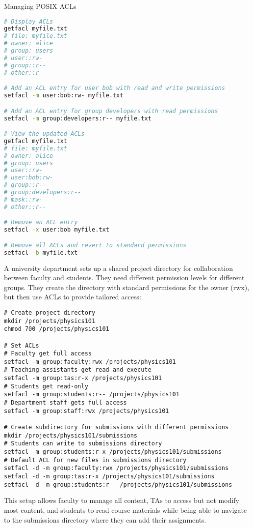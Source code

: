 \begin{code}{Managing POSIX ACLs}\\
\begin{lstlisting}[language=bash, style=basesmol]
# Display ACLs
getfacl myfile.txt
# file: myfile.txt
# owner: alice
# group: users
# user::rw-
# group::r--
# other::r--

# Add an ACL entry for user bob with read and write permissions
setfacl -m user:bob:rw- myfile.txt

# Add an ACL entry for group developers with read permissions
setfacl -m group:developers:r-- myfile.txt

# View the updated ACLs
getfacl myfile.txt
# file: myfile.txt
# owner: alice
# group: users
# user::rw-
# user:bob:rw-
# group::r--
# group:developers:r--
# mask::rw-
# other::r--

# Remove an ACL entry
setfacl -x user:bob myfile.txt

# Remove all ACLs and revert to standard permissions
setfacl -b myfile.txt
\end{lstlisting}
\end{code}

\begin{example}
A university department sets up a shared project directory for collaboration between faculty and students. They need different permission levels for different groups. They create the directory with standard permissions for the owner (rwx), but then use ACLs to provide tailored access:

\begin{lstlisting}[style=basesmol]
# Create project directory
mkdir /projects/physics101
chmod 700 /projects/physics101

# Set ACLs
# Faculty get full access
setfacl -m group:faculty:rwx /projects/physics101
# Teaching assistants get read and execute
setfacl -m group:tas:r-x /projects/physics101
# Students get read-only
setfacl -m group:students:r-- /projects/physics101
# Department staff gets full access
setfacl -m group:staff:rwx /projects/physics101

# Create subdirectory for submissions with different permissions
mkdir /projects/physics101/submissions
# Students can write to submissions directory
setfacl -m group:students:r-x /projects/physics101/submissions
# Default ACL for new files in submissions directory
setfacl -d -m group:faculty:rwx /projects/physics101/submissions
setfacl -d -m group:tas:r-x /projects/physics101/submissions
setfacl -d -m group:students:r-- /projects/physics101/submissions
\end{lstlisting}

This setup allows faculty to manage all content, TAs to access but not modify most content, and students to read course materials while being able to navigate to the submissions directory where they can add their assignments.
\end{example}

